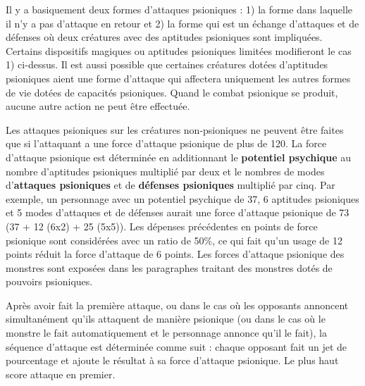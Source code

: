 \documentclass[11pt]{article}
\begin{document}
{Il y a basiquement deux formes d'attaques psioniques : 1) la forme dans laquelle il n'y a pas d'attaque en retour et 2) la forme qui est un échange d'attaques et de défenses où deux créatures avec des aptitudes psioniques sont impliquées. Certains dispositifs magiques ou aptitudes psioniques limitées modifieront le cas 1) ci-dessus. Il est aussi possible que certaines créatures dotées d'aptitudes psioniques aient une forme d'attaque qui affectera uniquement les autres formes de vie dotées de capacités psioniques. Quand le combat psionique se produit, aucune autre action ne peut être effectuée.

\medskip

Les attaques psioniques sur les créatures non-psioniques ne peuvent être faites que si l'attaquant a une force d'attaque psionique de plus de 120. La force d'attaque psionique est déterminée en additionnant le \textbf{potentiel psychique} au nombre d'aptitudes psioniques multiplié par deux et le nombres de modes d'\textbf{attaques psioniques} et de \textbf{défenses psioniques} multiplié par cinq. Par exemple, un personnage avec un potentiel psychique de 37, 6 aptitudes psioniques et 5 modes d'attaques et de défenses aurait une force d'attaque psionique de 73 (37 + 12 (6x2) + 25 (5x5)). Les dépenses précédentes en points de force psionique sont considérées avec un ratio de 50\%, ce qui fait qu'un usage de 12 points réduit la force d'attaque de 6 points. Les forces d'attaque psionique des monstres sont exposées dans les paragraphes traitant des monstres dotés de pouvoirs psioniques.

\medskip

Après avoir fait la première attaque, ou dans le cas où les opposants annoncent simultanément qu'ils attaquent de manière psionique (ou dans le cas où le monstre le fait automatiquement et le personnage annonce qu'il le fait), la séquence d'attaque est déterminée comme suit : chaque opposant fait un jet de pourcentage et ajoute le résultat à sa force d'attaque psionique. Le plus haut score attaque en premier.

\bigskip

}
\end{document}
